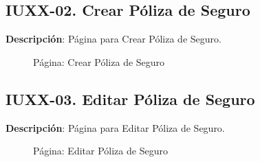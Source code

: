 \clearpage
\subsection{IUXX-02. Crear Póliza de Seguro} \label{sec:ui-page-create-polizaseguro}

\textbf{Descripción}: Página para Crear Póliza de Seguro.\\

\begin{figure}[H]
	\label{tab:ui-create-polizaseguro-page}
	\caption{Página: Crear Póliza de Seguro}
\end{figure}

\begin{table}[H]
	\caption{Forma: Crear Póliza de Seguro}
	\label{tab:ui-create-polizaseguro-form}
\end{table}

\clearpage
\subsection{IUXX-03. Editar Póliza de Seguro} \label{sec:ui-page-update-polizaseguro}

\textbf{Descripción}: Página para Editar Póliza de Seguro.\\

\begin{figure}[H]
	\label{tab:ui-edit-polizaseguro-page}
	\caption{Página: Editar Póliza de Seguro}
\end{figure}


